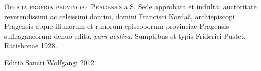 \vspace{1cm}
\textsc{Officia propria provinciae Pragensis}
a S. Sede approbata et indulta,
auctoritate reverendissimi ac celsissimi domini, domini Francisci Kordač,
archiepiscopi Pragensis atque ill.morum et r.morum episcoporum
provinciae Pragensis suffraganeorum denuo edita,
\textit{pars aestiva}. Sumptibus et typis Friderici Pustet, Ratisbonae 1928.

\vfill

\begin{center}
Editio Sancti Wolfgangi 2012.
\end{center}


